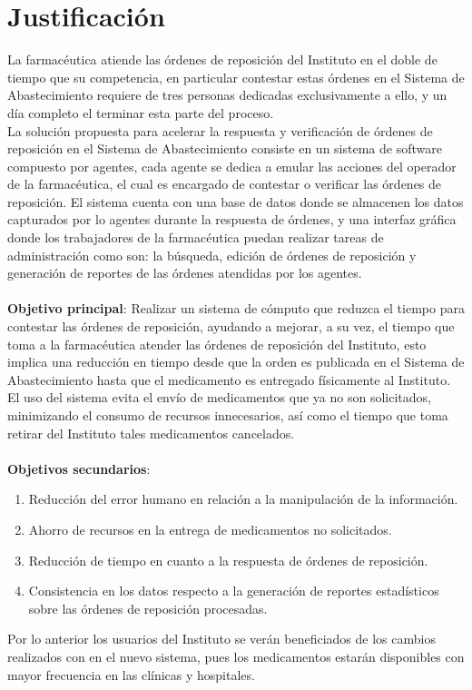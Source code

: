 \documentclass[letterpaper,11pt]{article}
\begin{document}
\section{Justificación}
La farmacéutica atiende las órdenes de reposición del Instituto en el doble de tiempo que su competencia, en particular contestar estas órdenes en el Sistema de Abastecimiento requiere de tres personas dedicadas exclusivamente a ello, y un día completo el terminar esta parte del proceso.\\
La solución propuesta para acelerar la respuesta y verificación de órdenes de reposición en el Sistema de Abastecimiento consiste en un sistema de software compuesto por agentes, cada agente se dedica a emular las acciones del operador de la farmacéutica, el cual es encargado de contestar o verificar las órdenes de reposición. El sistema cuenta con una base de datos donde se almacenen los datos capturados por lo agentes durante la respuesta de órdenes, y una interfaz gráfica donde los trabajadores de la farmacéutica puedan realizar tareas de administración como son: la búsqueda, edición de órdenes de reposición y generación de reportes de las órdenes atendidas por los agentes.\\
\\
\textbf{Objetivo principal}: Realizar un sistema de cómputo que reduzca el tiempo para contestar las órdenes de reposición, ayudando a mejorar, a su vez, el tiempo que toma a la farmacéutica atender las órdenes de reposición del Instituto, esto implica una reducción en tiempo desde que la orden es publicada en el Sistema de Abastecimiento hasta que el medicamento es entregado físicamente al Instituto.\\
El uso del sistema evita el envío de medicamentos que ya no son solicitados, minimizando el consumo de recursos innecesarios, así como el tiempo que toma retirar del Instituto tales medicamentos cancelados.\\
\\
\textbf{Objetivos secundarios}:
\begin{enumerate}
\item Reducción del error humano en relación a la manipulación de la información.
\item Ahorro de recursos en la entrega de medicamentos no solicitados.
\item Reducción de tiempo en cuanto a la respuesta de órdenes de reposición.
\item Consistencia en los datos respecto a la generación de reportes estadísticos sobre las órdenes de reposición procesadas.
\end{enumerate}
Por lo anterior los usuarios del Instituto se verán beneficiados de los cambios realizados con en el nuevo sistema, pues los medicamentos estarán disponibles con mayor frecuencia en las clínicas y hospitales.
\end{document}
